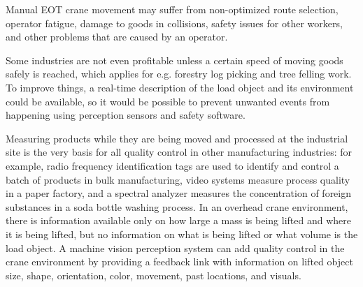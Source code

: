 \documentclass[12pt,a4paper,oneside,pdftex]{report}
\begin{document}


Manual EOT crane movement may suffer from non-optimized route selection, operator fatigue, damage to goods in collisions, safety issues for other workers, and other problems that are caused by an operator. 


Some industries are not even profitable unless a certain speed of moving goods safely is reached, which applies for e.g. forestry log picking and tree felling work. To improve things, a real-time description of the load object and its environment could be available, so it would be possible to prevent unwanted events from happening using perception sensors and safety software. \citep{Kappi13}

Measuring products while they are being moved and processed at the industrial site is the very basis for all quality control in other manufacturing industries: for example, radio frequency identification tags are used to identify and control a batch of products in bulk manufacturing, video systems measure process quality in a paper factory, and a spectral analyzer measures the concentration of foreign substances in a soda bottle washing process. In an overhead crane environment, there is information available only on how large a mass is being lifted and where it is being lifted, but no information on what is being lifted or what volume is the load object. A machine vision perception system can add quality control in the crane environment by providing a feedback link with information on lifted object size, shape, orientation, color, movement, past locations, and visuals.
\end{document}
